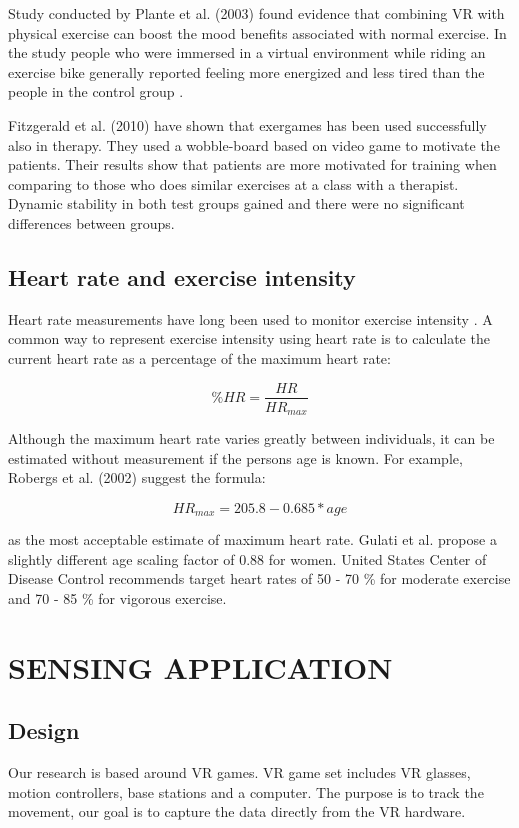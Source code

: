 \documentclass{sig-alternate-05-2015}
\begin{document}
Study conducted by Plante et al. (2003) found evidence that combining 
VR with physical exercise can boost the mood benefits associated with 
normal exercise. In the study people who were immersed in a virtual 
environment while riding an exercise bike generally reported feeling 
more energized and less tired than the people in the control group 
\cite{plante2003might}. 

Fitzgerald et al. (2010) have shown that exergames has been used successfully 
also in therapy. They used a wobble-board based on video game to motivate 
the patients. Their results show that patients are more motivated for 
training when comparing to those who does similar exercises at a class 
with a therapist. Dynamic stability in both test groups gained and there 
were no significant differences between groups. \cite{fitzgerald2010effects}

\subsection{Heart rate and exercise intensity}
Heart rate measurements have long been used to monitor exercise intensity 
\cite{achten2003heart}. A common way to represent exercise intensity 
using heart rate is to calculate the current heart rate as a percentage 
of the maximum heart rate: 

\begin{equation}\%HR = \frac{HR}{HR_{max}}\end{equation}

Although the maximum heart rate varies greatly between individuals, 
it can be estimated without measurement if the persons age is known. 
For example, Robergs et al. (2002) \cite{robergs2002surprising} suggest the formula:

\begin{equation}HR_{max} = 205.8 - 0.685 * age\end{equation}

as the most acceptable estimate of maximum heart rate. Gulati et al. 
\cite{gulati2005heart} propose a slightly different age scaling factor of 0.88 for women. 
United States Center of Disease Control \cite{cdc_heartrate} recommends target heart 
rates of 50 - 70 \% for moderate exercise and 70 - 85 \% for vigorous 
exercise.

\section{SENSING APPLICATION}
\subsection{Design}
Our research is based around VR games. VR game set includes VR glasses, 
motion controllers, base stations and a computer. The purpose is to track 
the movement, our goal is to capture the data directly from the VR 
hardware. 
\end{document}
